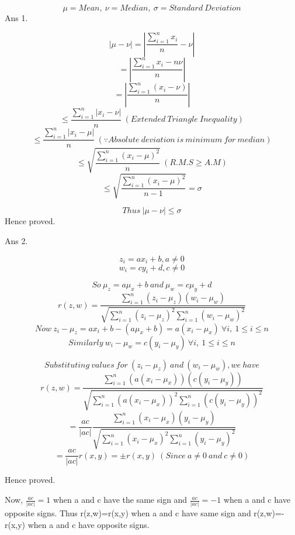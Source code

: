 \documentclass[11pt]{article}
\newcommand\abs[1]{\left|#1\right|}
\begin{document}
\maketitle
$$\mu = Mean,\ \nu=Median,\ \sigma=Standard\ Deviation$$
Ans 1.\begin{center}
$$|\mu-\nu|=\abs{\frac{\sum\limits_{i=1}^nx_i}{n}-\nu}$$
$$= \abs{\frac{\sum\limits_{i=1}^nx_i-n\nu}{n}}$$
$$= \abs{\frac{\sum\limits_{i=1}^n(x_i-\nu)}{n}}$$
$$\le \frac{\sum\limits_{i=1}^n\abs{x_i-\nu}}{n}\ (Extended\ Triangle\ Inequality)$$
$$\le  \frac{\sum\limits_{i=1}^n\abs{x_i-\mu}}{n}\ (\because Absolute\ deviation\ is\ minimum\ for\ median)$$
$$\le \sqrt{\frac{\sum\limits_{i=1}^n(x_i-\mu)^2}{n}}\ (R.M.S \ge A.M)$$
$$\le \sqrt{\frac{\sum\limits_{i=1}^n(x_i-\mu)^2}{n-1}} = \sigma$$

$$Thus\ \abs{\mu-\nu} \le \sigma$$
Hence proved.
\end{center}


\pagebreak
Ans 2.\begin{center}
$$z_i = ax_i + b, a\neq 0$$
$$w_i = cy_i + d, c\neq 0$$

$$So\ \mu_z = a\mu_x + b \ and \ \mu_w = c\mu_y+d$$
$$r(z,w) = \frac{\sum\limits_{i=1}^n(z_i - \mu_z)(w_i - \mu_w)}{\sqrt{{\sum\limits_{i=1}^n(z_i - \mu_z)^2}{\sum\limits_{i=1}^n(w_i - \mu_w)^2}}}$$
$$Now \ z_i - \mu_z = ax_i + b - (a\mu_x +b) = a(x_i - \mu_x) \ \forall i,\ 1\le i \le n$$
$$Similarly \ w_i - \mu_w = c(y_i - \mu_y) \ \forall i,\ 1\le i \le n$$

$$Substituting\ values\ for\ (z_i - \mu_z)\ and\ (w_i - \mu_w), we\ have$$
$$r(z,w) = \frac{\sum\limits_{i=1}^n(a(x_i - \mu_x))(c(y_i - \mu_y))}{\sqrt{{\sum\limits_{i=1}^n(a(x_i - \mu_x))^2}{\sum\limits_{i=1}^n(c(y_i - \mu_y))^2}}}$$
$$= \frac{ac}{|ac|}\frac{\sum\limits_{i=1}^n(x_i - \mu_x)(y_i - \mu_y)}{\sqrt{{\sum\limits_{i=1}^n(x_i - \mu_x)^2}{\sum\limits_{i=1}^n(y_i - \mu_y)^2}}}$$
$$=\frac{ac}{|ac|} r(x,y)= \pm r(x,y) \ (Since\ a\ne0\ and\ c\ne0)$$
\centerline{Hence proved.}\newline
Now, $\frac{ac}{|ac|}=1$ when a and c have the same sign and $\frac{ac}{|ac|}=-1$ when a and c have opposite signs.\newline
Thus r(z,w)=r(x,y) when a and c have same sign and r(z,w)=-r(x,y) when a and c have opposite signs.
\newline
\newline
\end{center}
\end{document}

